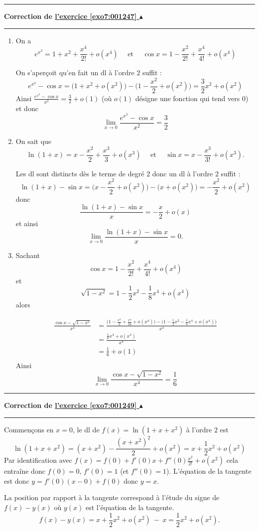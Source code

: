 \documentclass[11pt,a4paper]{article}
\newcounter{exo}
\newcommand{\correction}[1]{\hypertarget{cor7:#1}{}\label{cor7:#1}{\bf Correction de \hyperlink{exo7:#1}{l'exercice \ref{exo7:#1} $\blacktriangle$}}\vspace{1mm}\hrule\vspace{1mm}}
\newcommand{\fincorrection}{\vspace{1mm}\hrule\vspace*{7mm}}
\begin{document}
\fincorrection
\correction{001247}
\begin{enumerate}
  \item 
On a 
$$e^{x^2} = 1+x^2+\frac{x^4}{2!} + o(x^4) \quad \text{ et } \quad  \cos x= 1-\frac{x^2}{2!}+\frac{x^4}{4!} + o(x^4)$$

On s'aperçoit qu'en fait un dl à l'ordre $2$ suffit :
$$e^{x^2}-\cos x 
= \big(1+x^2 + o(x^2) \big) - \big(1-\frac{x^2}{2}+ o(x^2) \big)
= \frac32 x^2 + o(x^2)$$
Ainsi $\frac{e^{x^2}-\cos x}{x^2} = \frac32 + o(1)$ (où $o(1)$ désigne une fonction qui tend vers $0$)
 et donc
$$\lim_{x\rightarrow 0}\frac{e^{x^2}-\cos x}{x^2} = \frac32$$


  \item 
On sait que 
$$\ln(1+x)=x-\frac{x^2}{2}+\frac{x^3}{3}+o(x^3) 
\quad \text{ et } \quad \sin x = x-\frac{x^3}{3!} + o(x^3).$$

Les dl sont distincts dès le terme de degré $2$ donc un dl à l'ordre $2$ suffit :
$$\ln (1+x)-\sin x = \big(x - \frac{x^2}{2} + o(x^2) \big) - \big(x + o(x^2) \big) = -\frac{x^2}{2} + o(x^2)$$
donc 
$$\frac{\ln (1+x)-\sin x}{x} = -\frac{x}{2} + o(x)$$
et ainsi 
$$\lim_{x\rightarrow 0}\frac{\ln (1+x)-\sin x}{x} = 0.$$


  \item 
Sachant
$$\cos x= 1-\frac{x^2}{2!}+\frac{x^4}{4!}+ o(x^4)$$
et 
$$\sqrt{1-x^2} = 1-\frac12x^2-\frac18x^4 + o(x^4)$$ alors

\begin{align*}
\frac{\cos x-\sqrt{1-x^2}}{x^4}
 & =\frac{\big(1-\frac{x^2}{2}+\frac{x^4}{24}+ o(x^4)\big)-\big(1-\frac12x^2-\frac18x^4 + o(x^4)\big)}{x^4} \\
 & = \frac{\frac 16 x^4 + o(x^4)}{x^4}  \\
 &= \frac16+o(1) \\
\end{align*}
Ainsi 
$$\lim_{x\rightarrow 0}\frac{\cos x-\sqrt{1-x^2}}{x^4}=\frac16$$
\end{enumerate}
\fincorrection
\correction{001249}

Commençons en $x=0$, le dl de $f(x)=\ln(1+x+x^2)$ à l'ordre $2$
est 
$$\ln(1+x+x^2)
=(x+x^2)-\frac{(x+x^2)^2}{2} + o(x^2)
= x + \frac12 x^2 + o(x^2)$$
Par identification avec
$f(x)= f(0)+f'(0)x+f''(0)\frac{x^2}{2!}+o(x^2)$
cela entraîne donc $f(0)=0$, $f'(0)=1$ (et $f''(0)=1$).
L'équation de la tangente est donc
$y=f'(0)(x-0)+f(0)$ donc $y=x$.

La position par rapport à la tangente correspond à l'étude du signe de 
$f(x)-y(x)$ où $y(x)$ est l'équation de la tangente.
$$f(x)-y(x)=x + \frac12 x^2 + o(x^2) \  - \  x = \frac12 x^2 + o(x^2).$$
\end{document}
